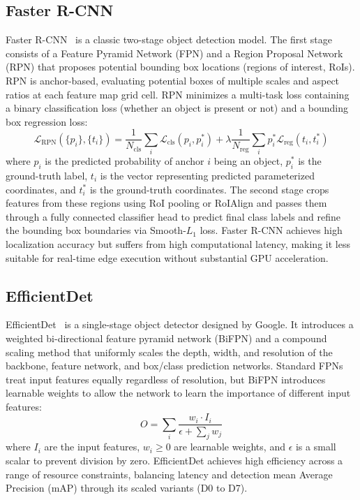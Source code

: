 \documentclass[11pt,a4paper]{report}
\begin{document}
\subsection{Faster R-CNN}
Faster R-CNN~\cite{faster_rcnn} is a classic two-stage object detection model. The first stage consists of a Feature Pyramid Network (FPN) and a Region Proposal Network (RPN) that proposes potential bounding box locations (regions of interest, RoIs). RPN is anchor-based, evaluating potential boxes of multiple scales and aspect ratios at each feature map grid cell. RPN minimizes a multi-task loss containing a binary classification loss (whether an object is present or not) and a bounding box regression loss:
\begin{equation}
    \mathcal{L}_{\text{RPN}}(\{p_i\}, \{t_i\}) = \frac{1}{N_{\text{cls}}} \sum_i \mathcal{L}_{\text{cls}}(p_i, p_i^*) + \lambda \frac{1}{N_{\text{reg}}} \sum_i p_i^* \mathcal{L}_{\text{reg}}(t_i, t_i^*)
\end{equation}
where $p_i$ is the predicted probability of anchor $i$ being an object, $p_i^*$ is the ground-truth label, $t_i$ is the vector representing predicted parameterized coordinates, and $t_i^*$ is the ground-truth coordinates. The second stage crops features from these regions using RoI pooling or RoIAlign and passes them through a fully connected classifier head to predict final class labels and refine the bounding box boundaries via Smooth-$L_1$ loss. Faster R-CNN achieves high localization accuracy but suffers from high computational latency, making it less suitable for real-time edge execution without substantial GPU acceleration.

\subsection{EfficientDet}
EfficientDet~\cite{efficientdet} is a single-stage object detector designed by Google. It introduces a weighted bi-directional feature pyramid network (BiFPN) and a compound scaling method that uniformly scales the depth, width, and resolution of the backbone, feature network, and box/class prediction networks. Standard FPNs treat input features equally regardless of resolution, but BiFPN introduces learnable weights to allow the network to learn the importance of different input features:
\begin{equation}
    O = \sum_i \frac{w_i \cdot I_i}{\epsilon + \sum_j w_j}
\end{equation}
where $I_i$ are the input features, $w_i \ge 0$ are learnable weights, and $\epsilon$ is a small scalar to prevent division by zero. EfficientDet achieves high efficiency across a range of resource constraints, balancing latency and detection mean Average Precision (mAP) through its scaled variants (D0 to D7).
\end{document}
